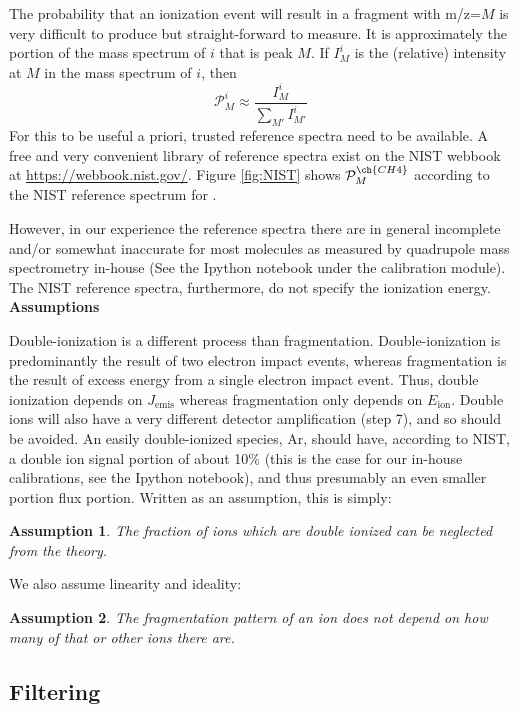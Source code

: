 \documentclass{article}
\newtheorem{assumption}{Assumption}
\begin{document}
The probability that an ionization event will result in a fragment with m/z=$M$ is very difficult to produce but straight-forward to measure. It is approximately the portion of the mass spectrum of $i$ that is peak $M$. If $I_M^i$ is the (relative) intensity at $M$ in the mass spectrum of $i$, then
\begin{equation}
\mathcal{P}^i_M \approx \frac{I_M^i}{\sum_{M'}I^i_{M'}} \label{eq:P}
\end{equation}
For this to be useful a priori, trusted reference spectra need to be available. A free and very convenient library of reference spectra exist on the NIST webbook at \url{https://webbook.nist.gov/}. Figure \ref{fig:NIST} shows $\mathcal{P}^{\ch{CH4}}_M$ according to the NIST reference spectrum for .

However, in our experience the reference spectra there are in general incomplete and/or somewhat inaccurate for most molecules as measured by quadrupole mass spectrometry in-house (See the Ipython notebook under the calibration module). The NIST reference spectra, furthermore, do not specify the ionization energy.
\\

\noindent\textbf{Assumptions}

Double-ionization is a different process than fragmentation. Double-ionization is predominantly the result of two electron impact events, whereas fragmentation is the result of excess energy from a single electron impact event. Thus, double ionization depends on $J_\text{emis}$ whereas fragmentation only depends on $E_\text{ion}$. Double ions will also have a very different detector amplification (step 7), and so should be avoided. An easily double-ionized species, Ar, should have, according to NIST, a double ion signal portion of about 10\% (this is the case for our in-house calibrations, see the Ipython notebook), and thus presumably an even smaller portion flux portion. Written as an assumption, this is simply:
\begin{assumption}
	The fraction of ions which are double ionized can be neglected from the theory.
\end{assumption}
We also assume linearity and ideality:
\begin{assumption}
	The fragmentation pattern of an ion does not depend on how many of that or other ions there are.
\end{assumption}


\subsection{Filtering}
\end{document}
